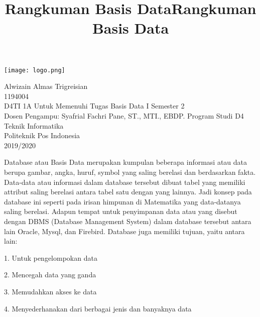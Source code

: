 \documentclass[a4paper, 12 pt]{article}
\author{}
\title{\textbf{Rangkuman Basis Data}\linebreak}
\date{}
\begin{document}
	
	\maketitle
	\begin{center}
		\texttt{[image: logo.png]}
	\end{center}
	\vspace{0.5 cm}
	
	\begin{center}
		Alwizain Almas Trigreisian \\
		1194004 \\
		D4TI 1A \linebreak
		\newline
		\newline
		\newline
		Untuk Memenuhi Tugas Basis Data I Semester 2 \\
		Dosen Pengampu: Syafrial Fachri Pane, ST., MTI., EBDP. \linebreak
		\newline
		\newline
		Program Studi D4 Teknik Informatika \\
		Politeknik Pos Indonesia\\
		2019/2020\\
	\end{center}
	
	\newpage
	\begin{flushleft}
		\title{\textbf{Rangkuman Basis Data}}\linebreak
	\end{flushleft}

	\par Database atau Basis Data merupakan kumpulan beberapa informasi atau data berupa 	gambar, angka, huruf, symbol yang saling berelasi dan berdasarkan fakta. Data-data 			atau informasi dalam database tersebut dibuat tabel yang memiliki attribut saling 			berelasi antara tabel satu dengan yang lainnya. Jadi konsep pada database ini 				seperti pada irisan himpunan di Matematika yang data-datanya saling berelasi. Adapun 	tempat untuk penyimpanan data atau yang disebut dengan DBMS (Database Management 			System) dalam database tersebut antara lain Oracle, Mysql, dan Firebird. Database 			juga memiliki tujuan, yaitu antara lain:
		\par 1. Untuk pengelompokan data
		\par 2. Mencegah data yang ganda
		\par 3. Memudahkan akses ke data
		\par 4. Menyederhanakan dari berbagai jenis dan banyaknya data\\ \linebreak
\end{document}
